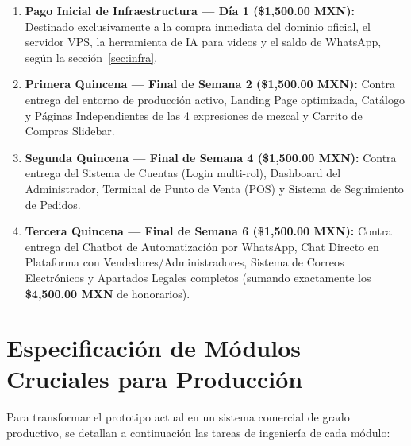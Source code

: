 \documentclass[11pt,letterpaper]{article}
\begin{document}
\begin{enumerate}[label=\textbf{\arabic*.}]
    \item \textbf{Pago Inicial de Infraestructura — Día 1 (\$1,500.00 MXN):} Destinado exclusivamente a la compra inmediata del dominio oficial, el servidor VPS, la herramienta de IA para videos y el saldo de WhatsApp, según la sección~\ref{sec:infra}.
    \item \textbf{Primera Quincena — Final de Semana 2 (\$1,500.00 MXN):} Contra entrega del entorno de producción activo, Landing Page optimizada, Catálogo y Páginas Independientes de las 4 expresiones de mezcal y Carrito de Compras Slidebar.
    \item \textbf{Segunda Quincena — Final de Semana 4 (\$1,500.00 MXN):} Contra entrega del Sistema de Cuentas (Login multi-rol), Dashboard del Administrador, Terminal de Punto de Venta (POS) y Sistema de Seguimiento de Pedidos.
    \item \textbf{Tercera Quincena — Final de Semana 6 (\$1,500.00 MXN):} Contra entrega del Chatbot de Automatización por WhatsApp, Chat Directo en Plataforma con Vendedores/Administradores, Sistema de Correos Electrónicos y Apartados Legales completos (sumando exactamente los \textbf{\$4,500.00 MXN} de honorarios).
\end{enumerate}

\section{Especificación de Módulos Cruciales para Producción}

Para transformar el prototipo actual en un sistema comercial de grado productivo, se detallan a continuación las tareas de ingeniería de cada módulo:
\end{document}
